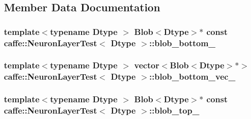 \subsection{Member Data Documentation}
\hypertarget{classcaffe_1_1_neuron_layer_test_a54d0371564c8241de164e82e0af6102c}{
\subsubsection[{blob\+\_\+bottom\+\_\+}]{\setlength{\rightskip}{0pt plus 5cm}template$<$typename Dtype $>$ {\bf Blob}$<$Dtype$>$$\ast$ const {\bf caffe\+::\+Neuron\+Layer\+Test}$<$ Dtype $>$\+::blob\+\_\+bottom\+\_\+\hspace{0.3cm}{\ttfamily [protected]}}}\label{classcaffe_1_1_neuron_layer_test_a54d0371564c8241de164e82e0af6102c}
\hypertarget{classcaffe_1_1_neuron_layer_test_afeee26d10841e52eea2c488dc0ac39b7}{
\subsubsection[{blob\+\_\+bottom\+\_\+vec\+\_\+}]{\setlength{\rightskip}{0pt plus 5cm}template$<$typename Dtype $>$ vector$<${\bf Blob}$<$Dtype$>$$\ast$$>$ {\bf caffe\+::\+Neuron\+Layer\+Test}$<$ Dtype $>$\+::blob\+\_\+bottom\+\_\+vec\+\_\+\hspace{0.3cm}{\ttfamily [protected]}}}\label{classcaffe_1_1_neuron_layer_test_afeee26d10841e52eea2c488dc0ac39b7}
\hypertarget{classcaffe_1_1_neuron_layer_test_a6e54ba573a61360912ab557ca0de7cfd}{
\subsubsection[{blob\+\_\+top\+\_\+}]{\setlength{\rightskip}{0pt plus 5cm}template$<$typename Dtype $>$ {\bf Blob}$<$Dtype$>$$\ast$ const {\bf caffe\+::\+Neuron\+Layer\+Test}$<$ Dtype $>$\+::blob\+\_\+top\+\_\+\hspace{0.3cm}{\ttfamily [protected]}}}\label{classcaffe_1_1_neuron_layer_test_a6e54ba573a61360912ab557ca0de7cfd}
